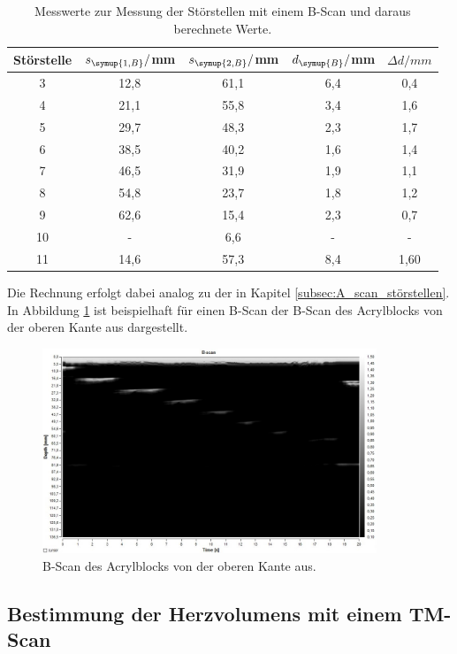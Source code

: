 \begin{table}[htp]
	\begin{center}
    \label{tab:b-scan}
    \caption{Messwerte zur Messung der Störstellen mit einem B-Scan und daraus berechnete Werte.}
		\begin{tabular}{ccccc}
		\toprule
			{Störstelle} & {$s_{\symup{1,B}}/$mm} & {$s_{\symup{2,B}}/$mm} & {$d_{\symup{B}}/$mm} & {$\Delta d/mm$}\\
			\midrule
			3 & 12,8 & 61,1 & 6,4 & 0,4\\
			4 & 21,1 & 55,8 & 3,4 & 1,6\\
			5 & 29,7 & 48,3 & 2,3 & 1,7\\
			6 & 38,5 & 40,2 & 1,6 & 1,4\\
			7 & 46,5 & 31,9 & 1,9 & 1,1\\
			8 & 54,8 & 23,7 & 1,8 & 1,2\\
			9 & 62,6 & 15,4 & 2,3 & 0,7\\
			10 & {-} & 6,6 & {-} & {-}\\
			11 & 14,6 & 57,3 & 8,4 & 1,60\\
		\bottomrule
		\end{tabular}
	\end{center}
\end{table}

Die Rechnung erfolgt dabei analog zu der in Kapitel \ref{subsec:A_scan_störstellen}.
In Abbildung \ref{fig:b-scan} ist beispielhaft für einen B-Scan der B-Scan des
Acrylblocks von der oberen Kante aus dargestellt.
\begin{figure}[H]
  \centering
  \includegraphics[width=10cm]{data/Bscanrechtsnachlinkswieinzeichnung.jpg}
  \caption{B-Scan des Acrylblocks von der oberen Kante aus.}
  \label{fig:b-scan}
\end{figure}

\subsection{Bestimmung der Herzvolumens mit einem TM-Scan}
\label{subsec:Herzvolumen}


